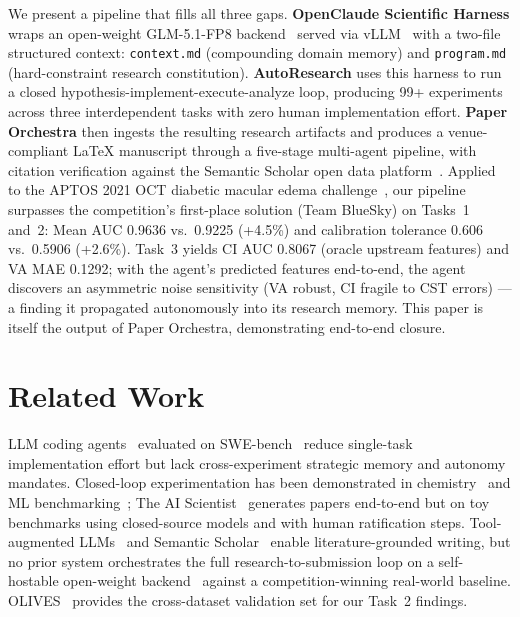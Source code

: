 \documentclass{article}
\begin{document}
We present a pipeline that fills all three gaps. \textbf{OpenClaude Scientific Harness} wraps an open-weight GLM-5.1-FP8 backend~\cite{Du2022GLM} served via vLLM~\cite{Kwon2023Efficient} with a two-file structured context: \texttt{context.md} (compounding domain memory) and \texttt{program.md} (hard-constraint research constitution). \textbf{AutoResearch} uses this harness to run a closed hypothesis-implement-execute-analyze loop, producing 99+ experiments across three interdependent tasks with zero human implementation effort. \textbf{Paper Orchestra} then ingests the resulting research artifacts and produces a venue-compliant LaTeX manuscript through a five-stage multi-agent pipeline, with citation verification against the Semantic Scholar open data platform~\cite{Kinney2023Semantic}. Applied to the APTOS 2021 OCT diabetic macular edema challenge~\cite{Chen2025Predicting}, our pipeline surpasses the competition's first-place solution (Team BlueSky) on Tasks~1 and~2: Mean AUC 0.9636 vs.\ 0.9225 (+4.5\%) and calibration tolerance 0.606 vs.\ 0.5906 (+2.6\%). Task~3 yields CI AUC 0.8067 (oracle upstream features) and VA MAE 0.1292; with the agent's predicted features end-to-end, the agent discovers an asymmetric noise sensitivity (VA robust, CI fragile to CST errors) — a finding it propagated autonomously into its research memory. This paper is itself the output of Paper Orchestra, demonstrating end-to-end closure.

\section{Related Work}
\label{sec:related}
LLM coding agents~\cite{Yang2024SWEagent,Wang2024OpenHands} evaluated on SWE-bench~\cite{Jimenez2023SWEbench} reduce single-task implementation effort but lack cross-experiment strategic memory and autonomy mandates. Closed-loop experimentation has been demonstrated in chemistry~\cite{Boiko2023Autonomous} and ML benchmarking~\cite{Huang2023MLAgentBench}; The AI Scientist~\cite{Lu2024AIScientist} generates papers end-to-end but on toy benchmarks using closed-source models and with human ratification steps. Tool-augmented LLMs~\cite{Schick2023Toolformer} and Semantic Scholar~\cite{Kinney2023Semantic} enable literature-grounded writing, but no prior system orchestrates the full research-to-submission loop on a self-hostable open-weight backend~\cite{Du2022GLM,Kwon2023Efficient} against a competition-winning real-world baseline. OLIVES~\cite{Prabhushankar2022OLIVES} provides the cross-dataset validation set for our Task~2 findings.
\end{document}
